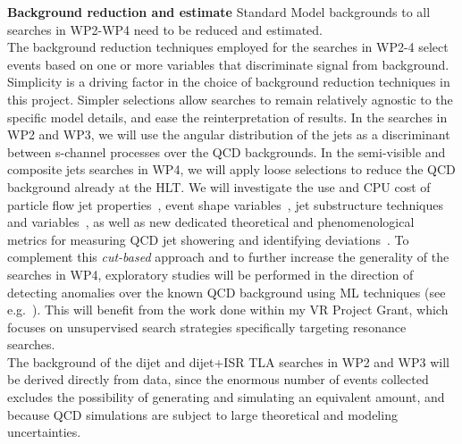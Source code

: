 \textbf{Background reduction and estimate}
Standard Model backgrounds to all searches in WP2-WP4 need to be reduced and estimated. \\
\noindent
The background reduction techniques employed for the searches in WP2-4 select events based on one or more variables that discriminate signal from background.
Simplicity is a driving factor in the choice of background reduction techniques in this project. 
Simpler selections allow searches to remain relatively agnostic to the specific model details, and ease the reinterpretation of results.
In the searches in WP2 and WP3, we will use the angular distribution of the jets as a discriminant between s-channel processes over the QCD backgrounds. 
In the semi-visible and composite jets searches in WP4, we will apply loose selections to reduce the QCD background already at the HLT. 
We will investigate the use and CPU cost of particle flow jet properties~\cite{Aaboud:2017aca}, %
event shape variables~\cite{STDM-2011-33}, %
jet substructure techniques and variables~\cite{Larkoski:2017jix}, %
as well as new dedicated theoretical and phenomenological metrics for measuring QCD jet showering and identifying deviations~\cite{Dreyer:2018nbf,Komiske:2019fks}. %
To complement this \textit{cut-based} approach and to further increase the generality of the searches in WP4, exploratory studies will be performed in the direction of detecting anomalies over the known QCD background using ML techniques (see e.g.~\cite{Cerri:2018anq,DAgnolo:2019vbw,Collins:2019jip}). %
This will benefit from the work done within my VR Project Grant, which focuses on unsupervised search strategies specifically targeting resonance searches.
\\
\noindent
The background of the dijet and dijet+ISR TLA searches in WP2 and WP3 will be derived directly from data, since the enormous number of events collected excludes the possibility of generating and simulating an equivalent amount, and because QCD simulations are subject to large theoretical and modeling uncertainties.  
